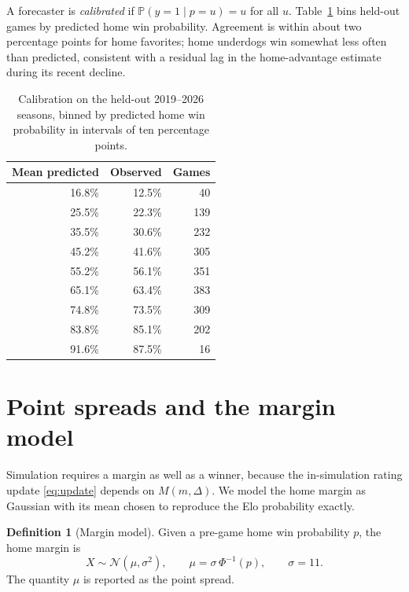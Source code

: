 \documentclass[11pt]{article}
\newcommand{\sigmaval}{11}         %
\newcommand{\testyears}{2019--2026}
\newcommand{\Prob}{\mathbb{P}}
\theoremstyle{plain}
\theoremstyle{definition}
\newtheorem{definition}{Definition}
\theoremstyle{remark}
\begin{document}
A forecaster is \emph{calibrated} if $\Prob(y = 1 \mid p = u) = u$ for all $u$. Table~\ref{tab:calibration} bins held-out games by predicted home win probability. Agreement is within about two percentage points for home favorites; home underdogs win somewhat less often than predicted, consistent with a residual lag in the home-advantage estimate during its recent decline.

\begin{table}[h]
\centering
\begin{tabular}{rrr}
\toprule
Mean predicted & Observed & Games \\
\midrule
16.8\% & 12.5\% & 40 \\
25.5\% & 22.3\% & 139 \\
35.5\% & 30.6\% & 232 \\
45.2\% & 41.6\% & 305 \\
55.2\% & 56.1\% & 351 \\
65.1\% & 63.4\% & 383 \\
74.8\% & 73.5\% & 309 \\
83.8\% & 85.1\% & 202 \\
91.6\% & 87.5\% & 16 \\
\bottomrule
\end{tabular}
\caption{Calibration on the held-out \testyears{} seasons, binned by predicted home win probability in intervals of ten percentage points.}
\label{tab:calibration}
\end{table}

\section{Point spreads and the margin model}\label{sec:margin}

Simulation requires a margin as well as a winner, because the in-simulation rating update \eqref{eq:update} depends on $M(m,\Delta)$. We model the home margin as Gaussian with its mean chosen to reproduce the Elo probability exactly.

\begin{definition}[Margin model]
Given a pre-game home win probability $p$, the home margin is
\begin{equation}\label{eq:margin}
  X \sim \mathcal{N}(\mu, \sigma^2), \qquad \mu = \sigma\,\Phi^{-1}(p), \qquad \sigma = \sigmaval.
\end{equation}
The quantity $\mu$ is reported as the point spread.
\end{definition}
\end{document}
